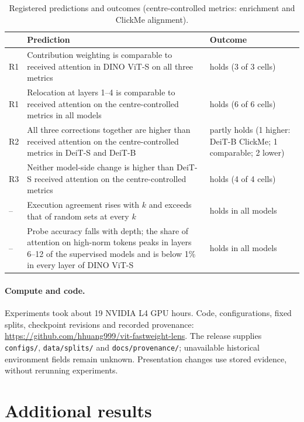 \begin{table}[!htbp]
\caption{Registered predictions and outcomes (centre-controlled metrics: enrichment and ClickMe alignment).}
\label{tab:app-registered}
\centering\footnotesize
\setlength{\tabcolsep}{4pt}
\begin{tabular}{@{}l>{\raggedright\arraybackslash}p{3.55in}>{\raggedright\arraybackslash}p{1.35in}@{}}
\toprule
 & Prediction & Outcome\\
\midrule
R1 & Contribution weighting is comparable to received attention in DINO ViT-S on all three metrics & holds (3 of 3 cells)\\
R1 & Relocation at layers 1--4 is comparable to received attention on the centre-controlled metrics in all models & holds (6 of 6 cells)\\
R2 & All three corrections together are higher than received attention on the centre-controlled metrics in DeiT-S and DeiT-B & partly holds (1 higher: DeiT-B ClickMe; 1 comparable; 2 lower)\\
R3 & Neither model-side change is higher than DeiT-S received attention on the centre-controlled metrics & holds (4 of 4 cells)\\
\midrule
-- & Execution agreement rises with $k$ and exceeds that of random sets at every $k$ & holds in all models\\
-- & Probe accuracy falls with depth; the share of attention on high-norm tokens peaks in layers 6--12 of the supervised models and is below 1\% in every layer of DINO ViT-S & holds in all models\\
\bottomrule
\end{tabular}
\end{table}

\paragraph{Compute and code.} Experiments took about 19 NVIDIA L4 GPU hours. Code, configurations, fixed splits, checkpoint revisions and recorded provenance: \url{https://github.com/hhuang999/vit-fastweight-lens}. The release supplies \texttt{configs/}, \texttt{data/splits/} and \texttt{docs/provenance/}; unavailable historical environment fields remain unknown. Presentation changes use stored evidence, without rerunning experiments.

\section{Additional results}
\label{app:more}
\suppressfloats[t]

